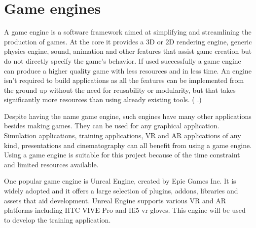 \documentclass[12pt, a4paper,oneside, nocenter]{thesis}
\renewcommand{\citep}[1]{(\citeauthor{#1} \citeyear{#1}.)}
\begin{document}
\section{Game engines}
A game engine is a software framework aimed at simplifying and streamlining the production of games. At the core it provides a 3D or 2D rendering engine, generic physics engine, sound, animation and other features that assist game creation but do not directly specify the game's behavior. If used successfully a game engine can produce a higher quality game with less resources and in less time. An engine isn't required to build applications as all the features can be implemented from the ground up without the need for reusability or modularity, but that takes significantly more resources than using already existing tools. \citep{game-engines}
\par
Despite having the name game engine, such engines have many other applications besides making games. They can be used for any graphical application. Simulation applications, training applications, VR and AR applications of any kind, presentations and cinematography can all benefit from using a game engine. Using a game engine is suitable for this project because of the time constraint and limited resources available. 
\par
One popular game engine is Unreal Engine, created by Epic Games Inc. It is widely adopted and it offers a large selection of plugins, addons, libraries and assets that aid development. Unreal Engine supports various VR and AR platforms including HTC VIVE Pro and Hi5 vr gloves. This engine will be used to develop the training application.
\end{document}
